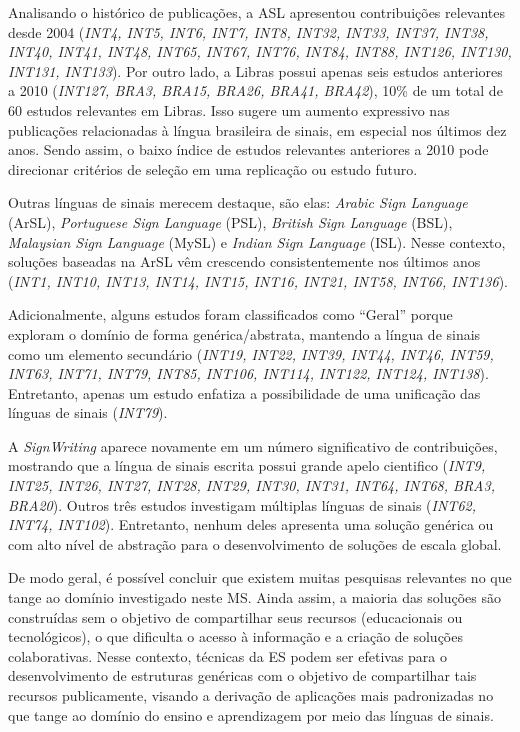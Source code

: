 Analisando o histórico de publicações, a ASL apresentou contribuições relevantes desde 2004 (\textit{INT4, INT5, INT6, INT7, INT8, INT32, INT33, INT37, INT38, INT40, INT41, INT48, INT65, INT67, INT76, INT84, INT88, INT126, INT130, INT131, INT133}). Por outro lado, a Libras possui apenas seis estudos anteriores a 2010 (\textit{INT127, BRA3, BRA15, BRA26, BRA41, BRA42}), 10\% de um total de 60 estudos relevantes em Libras. Isso sugere um aumento expressivo nas publicações relacionadas à língua brasileira de sinais, em especial nos últimos dez anos. Sendo assim, o baixo índice de estudos relevantes anteriores a 2010 pode direcionar critérios de seleção em uma replicação ou estudo futuro.

Outras línguas de sinais merecem destaque, são elas: \textit{Arabic Sign Language} (ArSL), \textit{Portuguese Sign Language} (PSL), \textit{British Sign Language} (BSL), \textit{Malaysian Sign Language} (MySL) e \textit{Indian Sign Language} (ISL). Nesse contexto, soluções baseadas na ArSL vêm crescendo consistentemente nos últimos anos (\textit{INT1, INT10, INT13, INT14, INT15, INT16, INT21, INT58, INT66, INT136}).

Adicionalmente, alguns estudos foram classificados como ``Geral'' porque exploram o domínio de forma genérica/abstrata, mantendo a língua de sinais como um elemento secundário (\textit{INT19, INT22, INT39, INT44, INT46, INT59, INT63, INT71, INT79, INT85, INT106, INT114, INT122, INT124, INT138}). Entretanto, apenas um estudo enfatiza a possibilidade de uma unificação das línguas de sinais (\textit{INT79}).

A \textit{SignWriting} aparece novamente em um número significativo de contribuições, mostrando que a língua de sinais escrita possui grande apelo cientifico (\textit{INT9, INT25, INT26, INT27, INT28, INT29, INT30, INT31, INT64, INT68, BRA3, BRA20}). Outros três estudos investigam múltiplas línguas de sinais (\textit{INT62, INT74, INT102}). Entretanto, nenhum deles apresenta uma solução genérica ou com alto nível de abstração para o desenvolvimento de soluções de escala global.

De modo geral, é possível concluir que existem muitas pesquisas relevantes no que tange ao domínio investigado neste MS. Ainda assim, a maioria das soluções são construídas sem o objetivo de compartilhar seus recursos (educacionais ou tecnológicos), o que dificulta o acesso à informação e a criação de soluções colaborativas. Nesse contexto, técnicas da ES podem ser efetivas para o desenvolvimento de estruturas genéricas com o objetivo de compartilhar tais recursos publicamente, visando a derivação de aplicações mais padronizadas no que tange ao domínio do ensino e aprendizagem por meio das línguas de sinais. %

